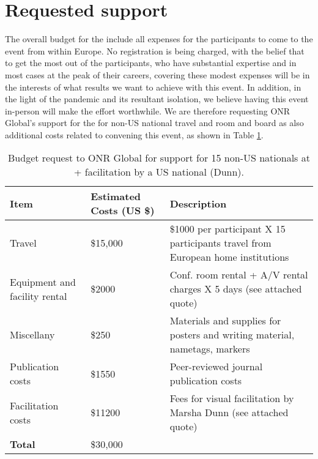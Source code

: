 \section{Requested  support}

The overall budget for the \symp include all expenses for the
participants to come to the event from within Europe. No registration
is being charged, with the belief that to get the most out of the
participants, who have substantial expertise and in most cases at the
peak of their careers, covering these modest expenses will be in the
interests of what results we want to achieve with this event. In
addition, in the light of the pandemic and its resultant isolation, we
believe having this event in-person will make the effort worthwhile.
We are therefore requesting ONR Global's support for the \symp for
non-US national travel and room and board as also additional costs
related to convening this event, as shown in Table
\ref{tab:nsf-budget}.

\begin{table}[!h]
  \footnotesize{
    \centering    
    \begin{tabular}{|p{3.0cm}|p{1.6cm}|p{10cm}|}
      \hline 
      \rowcolor{Gray}
      \bfseries Item& \bfseries Estimated Costs (US \$)&\bfseries Description\\
      \hline
      Travel & \$15,000 & \$1000 per participant X 15 participants
                          travel from European home institutions\\ 
      \hline
      Equipment and facility rental &\$2000 & Conf. room rental + A/V
                                              rental charges X 5 days
                                              (see attached quote)\\
      \hline
      Miscellany& \$250 & Materials and supplies for posters and writing material,
                          nametags, markers\\
      \hline
      Publication costs& \$1550 & Peer-reviewed journal publication
                                  costs\\
      \hline
      Facilitation costs& \$11200 & Fees for visual facilitation by Marsha
                                    Dunn (see attached quote)\\
      \hline
      \textbf{Total}& \$30,000&\\
      \hline        
  \end{tabular}
  \caption{Budget request to ONR Global for support for 15 non-US
    nationals at \sympe + facilitation by a US national (Dunn).}
  \label{tab:nsf-budget}
}
\end{table}

